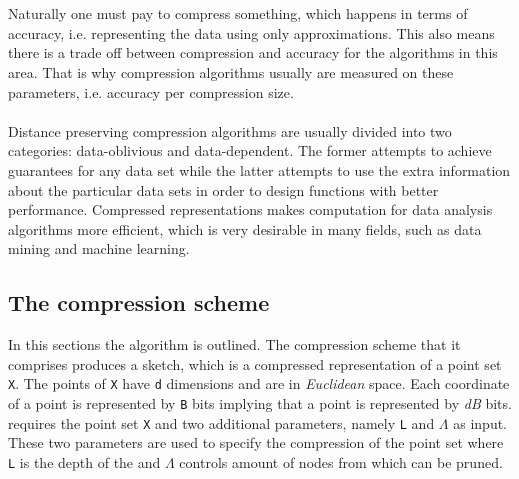 \\
\\
Naturally one must pay to compress something, which happens in terms of accuracy, i.e. representing the data using only approximations. This also means there is a trade off between compression and accuracy for the algorithms in this area. That is why compression algorithms usually are measured on these parameters, i.e. accuracy per compression size. %
\\
\\
Distance preserving compression algorithms are usually divided into two categories: data-oblivious and data-dependent. The former attempts to achieve guarantees for any data set while the latter attempts to use the extra information about the particular data sets in order to design functions with better performance. Compressed representations makes computation for data analysis algorithms more efficient, which is very desirable in many fields, such as data mining and machine learning\cite{stan15}.

\subsection{The \qs{} compression scheme}
\label{qs}
In this sections the \qs{} algorithm is outlined. The compression scheme that it comprises produces a sketch, which is a compressed representation of a point set \texttt{X}. The points of \texttt{X} have \texttt{d} dimensions and are in \textit{Euclidean} space. Each coordinate of a point is represented by \texttt{B} bits implying that a point is represented by \textit{dB} bits. \qs{} requires the point set \texttt{X} and two additional parameters, namely \texttt{L} and $\Lambda$ as input. These two parameters are used to specify the compression of the point set where \texttt{L} is the depth of the \qt{} and $\Lambda$ controls amount of nodes from \qt{} which can be pruned. 

